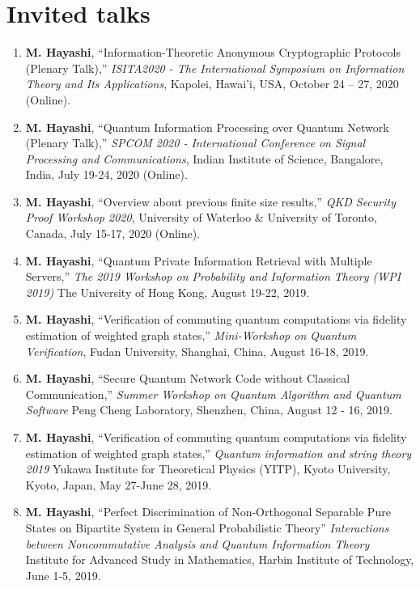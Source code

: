 \documentclass[a4paper,12pt,oneside]{article}
\begin{document}
\section{Invited talks}
\begin{enumerate}

\item 
\textbf{M. Hayashi}, 
``Information-Theoretic Anonymous Cryptographic Protocols (Plenary Talk),'' 
{\em  ISITA2020 - The International Symposium on Information Theory and Its Applications}, 
Kapolei, Hawai’i, USA, October 24 -- 27, 2020 (Online). 

\item 
\textbf{M. Hayashi}, 
``Quantum Information Processing over Quantum Network (Plenary Talk),'' 
{\em  SPCOM 2020 - International Conference on Signal Processing and Communications}, 
Indian Institute of Science, Bangalore, India, July 19-24, 2020 (Online). 

\item 
\textbf{M. Hayashi}, 
``Overview about previous finite size results,''
{\em  QKD Security Proof Workshop 2020}, 
University of Waterloo \& University of Toronto,
Canada, July 15-17, 2020 (Online). 

\item 
\textbf{M. Hayashi}, 
``Quantum Private Information Retrieval with Multiple Servers,''
{\em  The 2019 Workshop on Probability and Information Theory (WPI 2019)}
The University of Hong Kong, 
August 19-22, 2019. 

\item 
\textbf{M. Hayashi}, 
``Verification of commuting quantum computations via fidelity estimation of weighted graph states,''
{\em Mini-Workshop on Quantum Verification}, 
Fudan University, Shanghai, China,
August 16-18, 2019.

\item 
\textbf{M. Hayashi}, 
``Secure Quantum Network Code without Classical Communication,''
{\em  Summer Workshop on Quantum Algorithm and Quantum Software}
Peng Cheng Laboratory, Shenzhen, China,
August 12 - 16, 2019.

\item 
\textbf{M. Hayashi}, 
``Verification of commuting quantum computations via fidelity estimation of weighted graph states,''
{\em  Quantum information and string theory 2019}
Yukawa Institute for Theoretical Physics (YITP), Kyoto University, Kyoto, Japan,
May 27-June 28, 2019.

\item 
\textbf{M. Hayashi}, 
``Perfect Discrimination of Non-Orthogonal Separable Pure States on Bipartite System in General Probabilistic Theory''
{\em  Interactions between Noncommutative Analysis and Quantum Information Theory}
Institute for Advanced Study in Mathematics, Harbin Institute of Technology,
June 1-5, 2019.


\end{enumerate}
\end{document}
